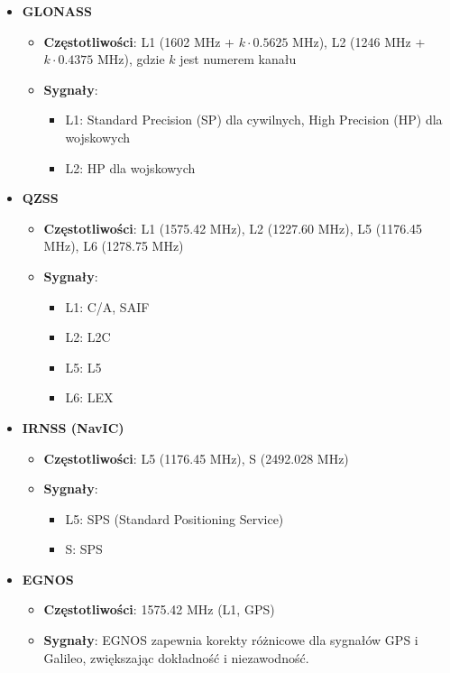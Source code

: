 \begin{itemize}
    \item \textbf{GLONASS}
    \begin{itemize}
        \item \textbf{Częstotliwości}: L1 (1602 MHz + $k \cdot 0.5625$ MHz), L2 (1246 MHz + $k \cdot 0.4375$ MHz), gdzie \( k \) jest numerem kanału
        \item \textbf{Sygnały}:
        \begin{itemize}
            \item L1: Standard Precision (SP) dla cywilnych, High Precision (HP) dla wojskowych
            \item L2: HP dla wojskowych
        \end{itemize}
    \end{itemize}

    \item \textbf{QZSS}
    \begin{itemize}
        \item \textbf{Częstotliwości}: L1 (1575.42 MHz), L2 (1227.60 MHz), L5 (1176.45 MHz), L6 (1278.75 MHz)
        \item \textbf{Sygnały}:
        \begin{itemize}
            \item L1: C/A, SAIF
            \item L2: L2C
            \item L5: L5
            \item L6: LEX
        \end{itemize}
    \end{itemize}

    \item \textbf{IRNSS (NavIC)}
    \begin{itemize}
        \item \textbf{Częstotliwości}: L5 (1176.45 MHz), S (2492.028 MHz)
        \item \textbf{Sygnały}:
        \begin{itemize}
            \item L5: SPS (Standard Positioning Service)
            \item S: SPS
        \end{itemize}
    \end{itemize}

    \item \textbf{EGNOS}
    \begin{itemize}
        \item \textbf{Częstotliwości}: 1575.42 MHz (L1, GPS)
        \item \textbf{Sygnały}: EGNOS zapewnia korekty różnicowe dla sygnałów GPS i Galileo, zwiększając dokładność i niezawodność.
    \end{itemize}


\end{itemize}
